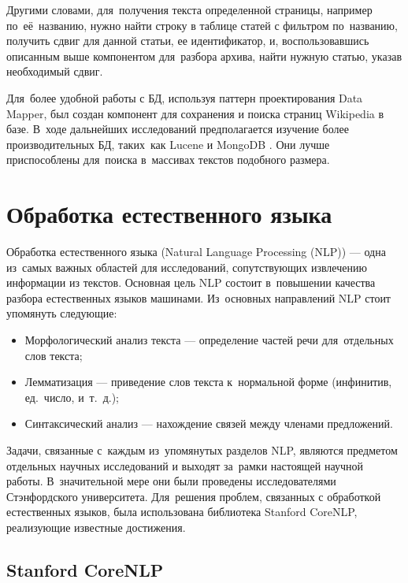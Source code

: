 Другими словами, для~получения текста определенной страницы, например по~её~названию,
нужно найти строку в таблице статей с фильтром по~названию,
получить сдвиг для данной статьи, ее идентификатор, и, 
воспользовавшись описанным выше компонентом для~разбора архива, найти нужную статью, 
указав необходимый сдвиг.

Для~более удобной работы с БД, используя паттерн проектирования Data Mapper\cite{patternMapper}, 
был создан компонент для сохранения и поиска страниц Wikipedia в базе.
В~ходе дальнейших исследований предполагается изучение более производительных БД, таких~как 
Lucene \cite{lucene} и 
MongoDB \cite{mongoDB}. 
Они лучше приспособлены для~поиска в~массивах текстов подобного размера.

\section{Обработка естественного языка}

Обработка естественного языка (Natural Language Processing (NLP))\cite{textminingsurvey} --- 
одна из~самых важных областей для исследований, сопутствующих извлечению информации из текстов.
Основная цель NLP состоит в~повышении качества разбора естественных языков машинами.
Из~основных направлений NLP стоит упомянуть следующие:

\begin{itemize}

\item {Морфологический анализ текста --- определение частей речи для~отдельных слов текста;}
\item {Лемматизация --- приведение слов текста к~нормальной форме (инфинитив, ед.~число, и~т.~д.);}
\item {Синтаксический анализ --- нахождение связей между членами предложений.}

\end{itemize}

Задачи, связанные с~каждым из~упомянутых разделов NLP, 
являются предметом отдельных научных исследований и выходят за~рамки настоящей научной работы.
В~значительной мере они были проведены исследователями Стэнфордского университета. 
Для~решения проблем, связанных с обработкой естественных языков, была использована библиотека  Stanford CoreNLP,
реализующие известные достижения.

\subsection{Stanford CoreNLP}
\label{st_corenlp}

